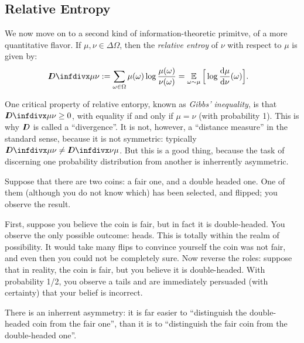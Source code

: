 


\subsection{Relative Entropy}
    \label{sec:relent-primer}

We now move on to a second kind of information-theoretic primitve, of a more quantitative flavor.
If $\mu, \nu \in \Delta \Omega$, then the \emph{relative entroy} of $\nu$ with respect to $\mu$ is given by:
%
\begin{align*}
    \kldiv {\mu} {\nu} 
    &:= \sum_{ \omega \in \Omega } \mu(\omega) \log \frac{ \mu(\omega) }{ \nu(\omega) }
    = \Ex_{\omega \sim \mu} \Big[ \log \frac{\mathrm d \mu}{\mathrm d \nu}(\omega) \Big].
\end{align*}

One critical property of relative entorpy, known as \emph{Gibbs' inequality}, is that
$\kldiv{\mu}{\nu} \ge 0$,
with equality if and only if $\mu = \nu$ (with probability 1). 
This is why $I\mkern-8muD$ is called a ``divergence''. 
It is not, however, a ``distance measure'' in the standard sense, because it is not symmetric: typically $\kldiv{\mu}{\nu} \ne \kldiv{\nu}{\mu}$. 
%
But this is a good thing, because
the task of discerning one probability distribution from another
is inherrently asymmetric. 

\begin{example}
    Suppose that there are two coins: a fair one, and a double headed one. 
    One of them (although you do not know which) has been selected, and flipped; you observe the result. 

    First, suppose you believe the coin is fair, but in fact it is double-headed. 
    You observe the only possible outcome: heads. This is totally within the realm of possibility. It would take many flips to convince yourself the coin was not fair, and even then you could not be completely sure. 
    Now reverse the roles: suppose that in reality, the coin is fair, but you believe it is double-headed. With probability 1/2, you observe a tails and are immediately persuaded (with certainty) that your belief is incorrect. 

    There is an inherrent asymmetry: it is far easier to ``distinguish the double-headed coin from the fair one'', than it is to ``distinguish the fair coin from the double-headed one''.
\end{example}

